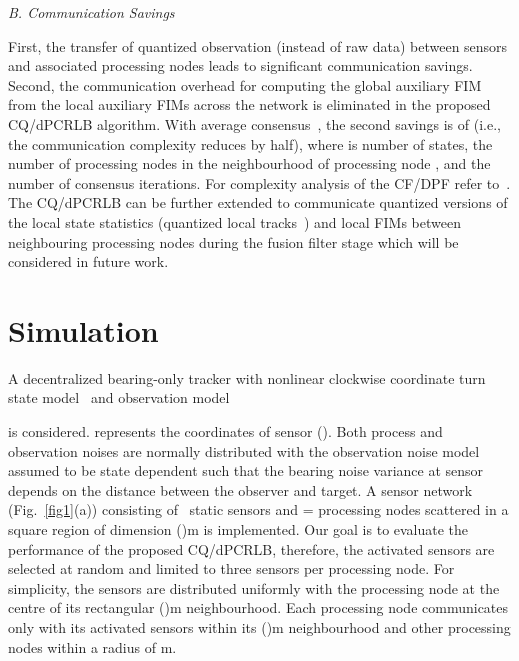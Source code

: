 \documentclass[10pt,twocolumn,twoside]{IEEEtran}
\begin{document}
\vspace{.05in}
\noindent
\textit{B. Communication Savings}

First, the transfer of quantized observation (instead of raw data)
between sensors and associated processing nodes leads to significant
communication savings.  Second, the communication overhead for
computing the global auxiliary FIM from the local auxiliary FIMs
across the network is eliminated in the proposed CQ/dPCRLB algorithm.
With average consensus~\cite{Arash:TSP1}, the second savings is of
 (i.e., the communication complexity reduces by half), where  is number of states,
 the number of processing nodes in the neighbourhood of
processing node , and  the number of consensus iterations.
For complexity analysis of the CF/DPF refer to~\cite{Arash:TSP1}.
The CQ/dPCRLB can  be further extended to communicate quantized versions of the local state statistics (quantized local tracks~\cite{Ruan:2005}) and  local FIMs between neighbouring processing nodes during the fusion filter stage which will be considered in future work.

\section{Simulation} \label{sec:simu}
A decentralized bearing-only tracker with nonlinear clockwise
coordinate turn state model~\cite{Arash:TSP1} and observation model

is considered.  represents the coordinates of
 sensor (). Both process and observation noises are normally
 distributed with the observation noise 
 model assumed to be state dependent such that the bearing noise
 variance at sensor  depends on the distance between the
 observer and target.
A sensor network (Fig.~\ref{fig1}(a)) consisting of~ static
sensors and  =  processing nodes scattered in a square region
of dimension ()m is implemented. Our goal is to
evaluate the performance of the proposed CQ/dPCRLB, therefore, the
activated sensors are selected at random and limited to three sensors
per processing node. For simplicity, the sensors are distributed
uniformly with the processing node at the centre of its rectangular
()m neighbourhood. Each processing node communicates
only with its activated sensors within its ()m
neighbourhood and other processing nodes within a radius of m.
\end{document}
